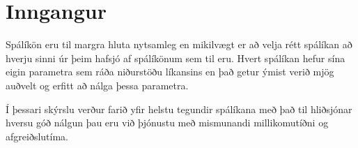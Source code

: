 \section{Inngangur}
Spálíkön eru til margra hluta nytsamleg en mikilvægt er að velja rétt spálíkan að hverju sinni úr þeim hafsjó af spálíkönum sem til eru. Hvert spálíkan hefur sína eigin parametra sem ráða niðurstöðu líkansins en það getur ýmist verið mjög auðvelt og erfitt að nálga þessa parametra. 

Í þessari skýrslu verður farið yfir helstu tegundir spálíkana með það til hliðsjónar  hversu góð nálgun þau eru við þjónustu með mismunandi millikomutíðni og afgreiðslutíma.